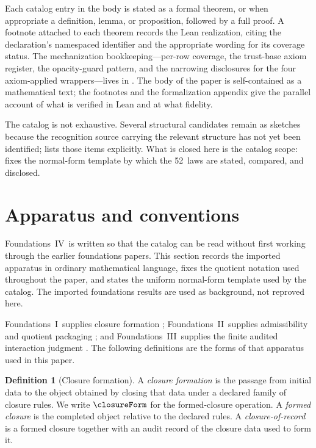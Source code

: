 \documentclass[11pt]{article}
\newcommand{\FIV}{Foundations~IV}
\newcommand{\FoundI}{Foundations~I}
\newcommand{\FoundII}{Foundations~II}
\newcommand{\FoundIII}{Foundations~III}
\newcommand{\NumLaws}{52}
\theoremstyle{definition}
\newtheorem{definition}[theorem]{Definition}
\begin{document}
Each catalog entry in the body is stated as a formal theorem, or
when appropriate a definition, lemma, or proposition, followed by a
full proof.  A footnote attached to each theorem records the Lean
realization, citing the declaration's namespaced identifier and the
appropriate wording for its coverage status.  The mechanization
bookkeeping---per-row coverage, the trust-base axiom register, the
opacity-guard pattern, and the narrowing disclosures for the four
axiom-applied wrappers---lives in .  The
body of the paper is self-contained as a mathematical text; the
footnotes and the formalization appendix give the parallel account
of what is verified in Lean and at what fidelity.

The catalog is not exhaustive.  Several structural candidates remain
as sketches because the recognition source carrying the relevant
structure has not yet been identified;  lists
those items explicitly.  What is closed here is the catalog scope:
 fixes the normal-form template by which the
\NumLaws\ laws are stated, compared, and disclosed.
 \section{Apparatus and conventions}\label{sec:apparatus}

\FIV\ is written so that the catalog can be read without first
working through the earlier foundations papers.  This section records
the imported apparatus in ordinary mathematical language, fixes the
quotient notation used throughout the paper, and states the uniform
normal-form template used by the catalog.  The imported foundations
results are used as background, not reproved here.

\FoundI\ supplies closure formation
\citep{Tsiokos2026EmergenceCalculus}; \FoundII\ supplies admissibility
and quotient packaging \citep{Tsiokos2026FoundationsII}; and
\FoundIII\ supplies the finite audited interaction judgment
\citep{Tsiokos2026FoundationsIII}.  The following definitions are the
forms of that apparatus used in this paper.

\begin{definition}[Closure formation]\label{def:closure-formation}
A \emph{closure formation} is the passage from initial data to the
object obtained by closing that data under a declared family of closure
rules.  We write \(\closureForm\) for the formed-closure operation.  A
\emph{formed closure} is the completed object relative to the declared
rules.  A \emph{closure-of-record} is a formed closure together with an
audit record of the closure data used to form it.
\end{definition}
\end{document}
